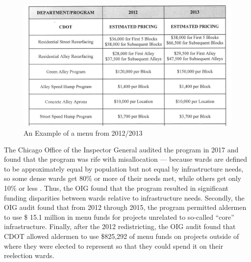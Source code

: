 \begin{figure}[H]
    \centering
    \caption{An Example of a menu from 2012/2013}\label{fig:menu_example}
    \includegraphics[scale=0.38]{input/menu_example.png}
\end{figure}

The Chicago Office of the Inspector General audited the program in 2017 and found that the program was rife with misallocation --- because wards are defined to be approximately equal by population but not equal by infrastructure needs, so some dense wards get 80\% or more of their needs met, while others get only 10\% or less \citep{OIGaudit}.
Thus, the OIG found that the program resulted in significant funding disparities between wards relative to infrastructure needs.
Secondly, the OIG audit found that from 2012 through 2015, the program permitted aldermen to use \$ 15.1 million in menu funds for projects unrelated to so-called ``core'' infrastructure.
Finally, after the 2012 redistricting, the OIG audit found that CDOT allowed aldermen to use \$825,292 of menu funds on projects outside of where they were elected to represent so that they could spend it on their reelection wards.
